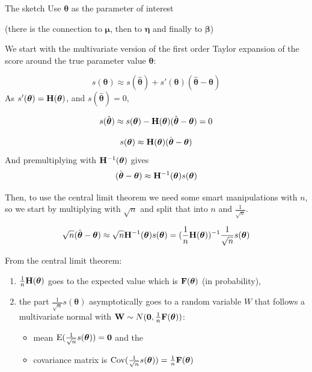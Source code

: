 \documentclass[
  ignorenonframetext,
]{beamer}
\providecommand{\tightlist}{%
  \setlength{\itemsep}{0pt}\setlength{\parskip}{0pt}}
\begin{document}
\begin{frame}
\begin{block}{The sketch}
\label{the-sketch}
Use \(\boldsymbol{\theta}\) as the parameter of interest

(there is the connection to \(\boldsymbol{\mu}\), then to
\(\boldsymbol{\eta}\) and finally to \(\boldsymbol{\beta}\))

We start with the multivariate version of the first order Taylor
expansion of the score around the true parameter value
\(\boldsymbol{\theta}\):

\[s({\boldsymbol{\theta}}) \approx s(\hat{\boldsymbol{\theta}}) + s'({\boldsymbol{\theta}})(\hat{\boldsymbol{\theta}}-{\boldsymbol{\theta}})\]
As \(s'({\boldsymbol{\theta}}) = {\bf H}({\boldsymbol{\theta}})\), and
\(s(\hat{\boldsymbol{\theta}})=0\),

\[s(\hat{\boldsymbol{\theta}})\approx s({\boldsymbol{\theta}})-{\bf H}({\boldsymbol{\theta}})(\hat{\boldsymbol{\theta}}-{\boldsymbol{\theta}}) = 0\]

\[s({\boldsymbol{\theta}})\approx {\bf H}({\boldsymbol{\theta}})(\hat{\boldsymbol{\theta}}-{\boldsymbol{\theta}})\]
And premultiplying with \({\bf H}^{-1}(\boldsymbol{\theta})\) gives
\[ (\hat{\boldsymbol{\theta}}-{\boldsymbol{\theta}})\approx {\bf H}^{-1}({\boldsymbol{\theta}})s({\boldsymbol{\theta}})\]
\end{block}
\end{frame}

\begin{frame}
Then, to use the central limit theorem we need some smart manipulations
with \(n\), so we start by multiplying with \(\sqrt{n}\) and split that
into \(n\) and \(\frac{1}{\sqrt{n}}\).

\[ \sqrt{n}(\hat{\boldsymbol{\theta}}-{\boldsymbol{\theta}})\approx \sqrt{n}{\bf H}^{-1}({\boldsymbol{\theta}})s({\boldsymbol{\theta}})=(\frac{1}{n}{\bf H}({\boldsymbol{\theta}}))^{-1}\frac{1}{\sqrt{n}}s({\boldsymbol{\theta}})\]

From the central limit theorem:

\begin{enumerate}
[1)]
\item
  \(\frac{1}{n}{\bf H}(\boldsymbol{\theta})\) goes to the expected value
  which is \({\bf F}(\boldsymbol{\theta})\) (in probability),
\item
  the part \(\frac{1}{\sqrt{n}}s({\boldsymbol{\theta}})\) asymptotically
  goes to a random variable \(W\) that follows a multivariate normal
  with
  \({\bf W} \sim N({\bf 0},\frac{1}{n}{\bf F}(\boldsymbol{\theta}))\):

  \begin{itemize}
  \tightlist
  \item
    mean
    \(\text{E}(\frac{1}{\sqrt{n}}s({\boldsymbol{\theta}}))={\bf 0}\) and
    the
  \item
    covariance matrix is
    \(\text{Cov}(\frac{1}{\sqrt{n}}s({\boldsymbol{\theta}}))=\frac{1}{n}{\bf F}(\boldsymbol{\theta})\)
  \end{itemize}
\end{enumerate}
\end{frame}
\end{document}
